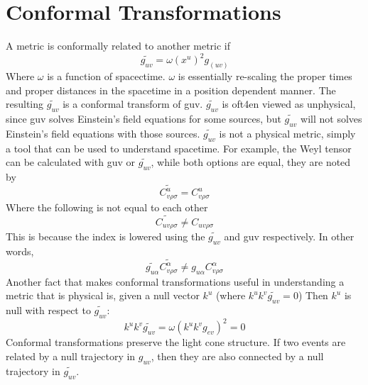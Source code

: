 \documentclass[10pt]{article}
\begin{document}
              	\section{Conformal Transformations }\label{sec:class_style}
              		 A metric is conformally related to another metric if
              		 \begin{equation}
              		 \widetilde{g_{uv}}=\omega(x^u)^2g_(uv)
              		 \end{equation}
              		 Where \(\omega\) is a function of spacectime.  \(\omega\) is essentially re-scaling the proper times and proper distances in the spacetime in a position dependent manner. The resulting 	\(\widetilde{g_{uv}}\) is a conformal transform of guv.
              	\(\widetilde{g_{uv}}\) is oft4en viewed as unphysical, since guv solves Einstein's field equations for some sources, but 	\(\widetilde{g_{uv}}\) will not solves Einstein's field equations with those sources. 	\(\widetilde{g_{uv}}\) is not a physical metric, simply a tool that can be used to understand spacetime.
              		 For example, the Weyl tensor can be calculated with guv or 	\(\widetilde{g_{uv}}\), while both options are equal, they are noted by 
              		  \begin{equation}
              		\widetilde{C^u_{v\rho\sigma}}=C^u_{v\rho\sigma}
              		 \end{equation}
              		 Where the following is not equal to each other
              		   \begin{equation}
              		\widetilde{C_{uv\rho\sigma}}\neq{C_{uv\rho\sigma}}
              		 \end{equation}
              		 This is because the index is lowered using the 	\(\widetilde{g_{uv}}\) and guv respectively. In other words, 
              		  \begin{equation}
              	 \widetilde{g_{u\alpha}}\widetilde{C^\alpha_{v\rho\sigma}}\neq{g_{u\alpha}C^\alpha_{v\rho\sigma}}
              		 \end{equation}
              		  	Another fact that makes conformal transformations useful in understanding a metric that is physical is, given a null vector \(k^u\) (where \(k^uk^v\widetilde{g_{uv}}=0\)) Then \(k^u\) is null with respect to \(\widetilde{g_{uv}}\):
              		  		 \begin{equation}
              		 k^uk^v\widetilde{g_{uv}}=\omega(k^uk^vg_{ev})^2=0
              		 \end{equation}
              		 Conformal transformations preserve the light cone structure. If two events are related by a null trajectory in \({g_{uv}}\), then they are also connected by a null trajectory in 	\(\widetilde{g_{uv}}\). 
\end{document}
